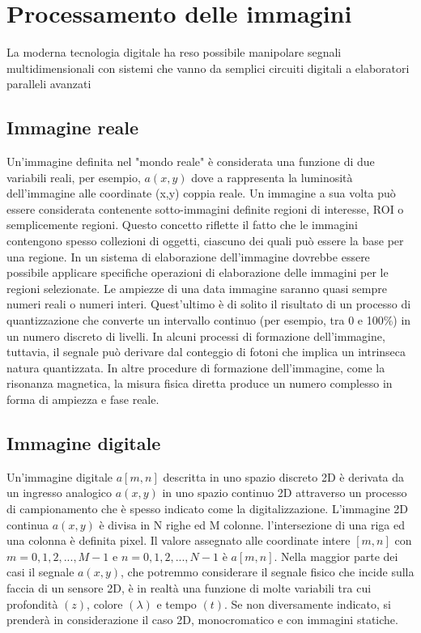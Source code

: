 \section{Processamento delle immagini}

La moderna tecnologia digitale ha reso possibile manipolare 
segnali multidimensionali con sistemi che vanno da semplici circuiti digitali a elaboratori paralleli avanzati

\subsection{Immagine reale} 
Un'immagine definita nel "mondo reale" è considerata una funzione di due variabili reali,
per esempio, $a(x, y)$ dove a rappresenta la luminosità dell'immagine alle coordinate (x,y) 
coppia reale. Un immagine a sua volta può essere considerata contenente sotto-immagini definite
regioni di interesse, ROI o semplicemente regioni.
Questo concetto riflette il fatto che le immagini contengono spesso collezioni di oggetti, ciascuno dei quali può essere la base per una
regione.
In un sistema di elaborazione dell'immagine dovrebbe essere possibile applicare
specifiche operazioni di elaborazione delle immagini per le regioni selezionate. 
Le ampiezze di una data immagine saranno quasi sempre numeri reali o
numeri interi. Quest'ultimo è di solito il risultato di un processo di quantizzazione che
converte un intervallo continuo (per esempio, tra 0 e 100\%) in  un numero discreto di
livelli. In alcuni processi di formazione dell'immagine, tuttavia, il segnale può derivare dal
conteggio di fotoni che implica un intrinseca natura quantizzata.
In altre procedure di formazione dell'immagine, come la risonanza magnetica, la
misura fisica diretta produce un numero complesso in forma di ampiezza e fase reale.

\subsection{Immagine digitale}

Un'immagine digitale $a[m, n]$ descritta in uno spazio discreto 2D è derivata da un ingresso analogico
$a(x, y)$ in uno spazio continuo 2D attraverso un processo di campionamento che è
spesso indicato come la digitalizzazione.
L'immagine 2D continua $a(x, y)$ è divisa in N righe ed M colonne. l'intersezione di una riga ed una colonna è definita pixel. Il valore assegnato alle coordinate intere $[m, n]$ con ${m = 0,1,2, ..., M-1}$ e ${n = 0,1,2, ..., N-1}$ è
$a[m, n]$. 
Nella maggior parte dei casi il segnale  $a(x, y)$, che potremmo considerare il segnale fisico
che incide sulla faccia di un sensore 2D, è in realtà una funzione di molte
variabili tra cui profondità $(z)$, colore $(\lambda)$ e tempo $(t)$.
Se non diversamente indicato, si prenderà in considerazione il caso  2D, monocromatico e con immagini statiche.



